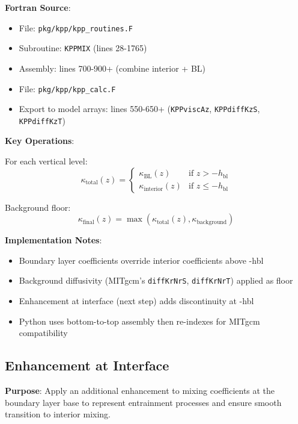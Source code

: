 \documentclass[11pt]{article}
\begin{document}
\textbf{Fortran Source}:
\begin{itemize}
    \item File: \verb|pkg/kpp/kpp_routines.F|
    \item Subroutine: \verb|KPPMIX| (lines 28-1765)
    \item Assembly: lines 700-900+ (combine interior + BL)
    \item File: \verb|pkg/kpp/kpp_calc.F|
    \item Export to model arrays: lines 550-650+ (\verb|KPPviscAz|, \verb|KPPdiffKzS|, \verb|KPPdiffKzT|)
\end{itemize}

\textbf{Key Operations}:

For each vertical level:
\begin{equation}
\kappa_{\text{total}}(z) = \begin{cases}
\kappa_{\text{BL}}(z) & \text{if } z > -h_{\text{bl}} \\
\kappa_{\text{interior}}(z) & \text{if } z \leq -h_{\text{bl}}
\end{cases}
\end{equation}

Background floor:
\begin{equation}
\kappa_{\text{final}}(z) = \max(\kappa_{\text{total}}(z), \kappa_{\text{background}})
\end{equation}

\textbf{Implementation Notes}:
\begin{itemize}
    \item Boundary layer coefficients override interior coefficients above -hbl
    \item Background diffusivity (MITgcm's \verb|diffKrNrS|, \verb|diffKrNrT|) applied as floor
    \item Enhancement at interface (next step) adds discontinuity at -hbl
    \item Python uses bottom-to-top assembly then re-indexes for MITgcm compatibility
\end{itemize}

\subsection{Enhancement at Interface}

\textbf{Purpose}: Apply an additional enhancement to mixing coefficients at the boundary layer base to represent entrainment processes and ensure smooth transition to interior mixing.
\end{document}
